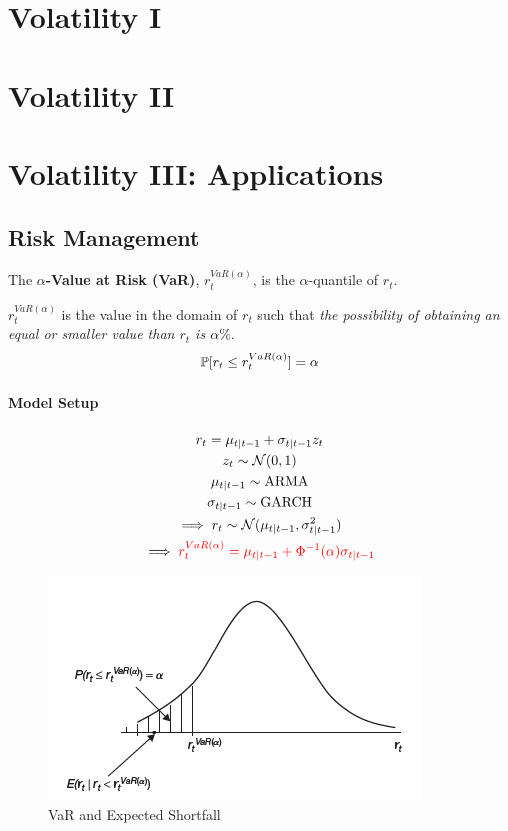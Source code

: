 \documentclass[11pt]{article}
\begin{document}
	\section{Volatility I}
	
	\section{Volatility II}
	
	\section{Volatility III: Applications}
		\subsection{Risk Management}
			\begin{definition}
				The \textbf{$\alpha$-Value at Risk (VaR)}, $r_t^{VaR(\alpha)}$, is the $\alpha$-quantile of $r_t$.
			\end{definition}
			
			\begin{remark}[Interpretation]
				$r_t^{VaR(\alpha)}$ is the value in the domain of $r_t$ such that \emph{the possibility of obtaining an equal or smaller value than $r_t$ is $\alpha \%$}.
				\begin{equation}
					\mathbb{P}[{r_t \leq r_t^{VaR(\alpha)}}] = \alpha
				\end{equation}
			\end{remark}
	
			\paragraph{Model Setup}
				\begin{gather}
					r_t = \mu_{t|t-1} + \sigma_{t|t-1}z_t \\
					z_t \sim \mathcal{{N}}(0, 1) \\
					\mu_{t|t-1} \sim \text{{ARMA}} \\
					\sigma_{t|t-1} \sim \text{{GARCH}} \\
					\implies r_t \sim \mathcal{{N}}(\mu_{t|t-1}, \sigma_{t|t-1}^2) \\
					\implies \textcolor{red}{r_t^{VaR(\alpha)} = \mu_{t|t-1} + \Phi^{-1}(\alpha) \sigma_{t|t-1}}
				\end{gather}
				
			\begin{figure}[h]
				\centering
				\includegraphics[width=0.7\linewidth]{figures/lec12.png}
				\caption{VaR and Expected Shortfall}
			\end{figure}
			
\end{document}
